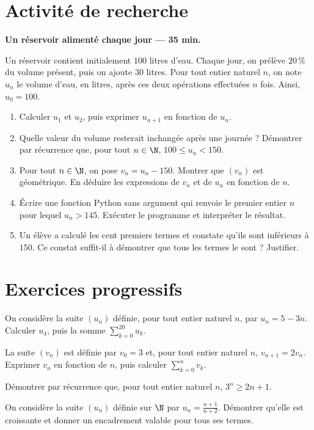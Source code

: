 \section{Activité de recherche}\textbf{Un réservoir alimenté chaque jour --- 35 min.}\par Un réservoir contient initialement $100$ litres d'eau. Chaque jour, on prélève $20\,\%$ du volume présent, puis on ajoute $30$ litres. Pour tout entier naturel $n$, on note $u_n$ le volume d'eau, en litres, après ces deux opérations effectuées $n$ fois. Ainsi, $u_0=100$.
\begin{enumerate}\item Calculer $u_1$ et $u_2$, puis exprimer $u_{n+1}$ en fonction de $u_n$.
\item Quelle valeur du volume resterait inchangée après une journée ? Démontrer par récurrence que, pour tout $n\in\N$, $100\le u_n<150$.
\item Pour tout $n\in\N$, on pose $v_n=u_n-150$. Montrer que $(v_n)$ est géométrique. En déduire les expressions de $v_n$ et de $u_n$ en fonction de $n$.
\item Écrire une fonction Python sans argument qui renvoie le premier entier $n$ pour lequel $u_n>145$. Exécuter le programme et interpréter le résultat.
\item Un élève a calculé les cent premiers termes et constate qu'ils sont inférieurs à $150$. Ce constat suffit-il à démontrer que tous les termes le sont ? Justifier.\end{enumerate}

\section{Exercices progressifs}

On considère la suite $(u_n)$ définie, pour tout entier naturel $n$, par $u_n=5-3n$. Calculer $u_4$, puis la somme $\displaystyle\sum_{k=0}^{20}u_k$.

La suite $(v_n)$ est définie par $v_0=3$ et, pour tout entier naturel $n$, $v_{n+1}=2v_n$. Exprimer $v_n$ en fonction de $n$, puis calculer $\displaystyle\sum_{k=0}^n v_k$.

Démontrer par récurrence que, pour tout entier naturel $n$, $3^n\ge2n+1$.

On considère la suite $(u_n)$ définie sur $\N$ par $u_n=\frac{n+1}{n+2}$. Démontrer qu'elle est croissante et donner un encadrement valable pour tous ses termes.

